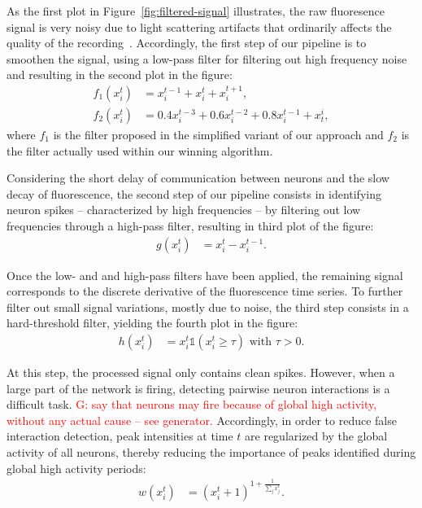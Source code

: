 \documentclass[wcp]{jmlr}
\begin{document}
As the first plot in Figure~\ref{fig:filtered-signal} illustrates, the raw
fluoresence signal is very noisy due to light scattering artifacts that
ordinarily affects the quality of the recording~\citep{lichtman2011big}.
Accordingly, the first step of our pipeline is to smoothen the signal, using a
low-pass filter for filtering out high frequency noise and resulting in the
second plot in the figure:
\begin{align}
f_1(x^t_i) &= x^{t-1}_i + x^{t}_i + x^{t+1}_i \label{eq:symetric-median}, \\
f_2(x^t_i) &= 0.4 x^{t-3}_i + 0.6 x^{t-2}_i + 0.8 x^{t-1}_i + x_{t}^i,
\label{eq:weighted-asymetric-median}
\end{align}
where $f_1$ is the filter proposed in the simplified variant of our approach
and $f_2$ is the filter actually used within our winning algorithm.

Considering the short delay of communication between neurons and the slow
decay of fluorescence, the second step of our pipeline consists in identifying
neuron spikes -- characterized by high frequencies -- by filtering out low
frequencies through a high-pass filter, resulting in third plot of the figure:
\begin{align} %
g(x^{t}_{i}) &= x^{t}_i - x^{t-1}_i. \label{eq:high-pass-filter}
\end{align}

Once the low- and and high-pass filters have been applied, the remaining signal
corresponds to the discrete derivative of the fluorescence time series. To
further filter out small signal variations, mostly due to noise, the third step
consists in a  hard-threshold filter, yielding the fourth plot in the figure:
\begin{align}
h(x^{t}_i) &= x^{t}_i \mathbb{1}(x^{t}_i \geq \tau) \text{ with } \tau > 0.
\end{align}

At this step, the processed signal only contains clean spikes. However, when a
large part of the network is firing, detecting pairwise neuron interactions is a
difficult task. \textcolor{red}{G: say that neurons may fire because of global
high activity, without any actual cause -- see generator.}
Accordingly, in order to reduce false interaction detection,
peak intensities at time $t$ are regularized by the global activity of all
neurons, thereby reducing the importance of peaks identified during global high activity periods:
\begin{align}
 w(x^{t}_i) &= (x^{t}_i + 1 )^{1 + \frac{1}{\sum_{j} x^{t}_j}}.
\end{align}
\end{document}
